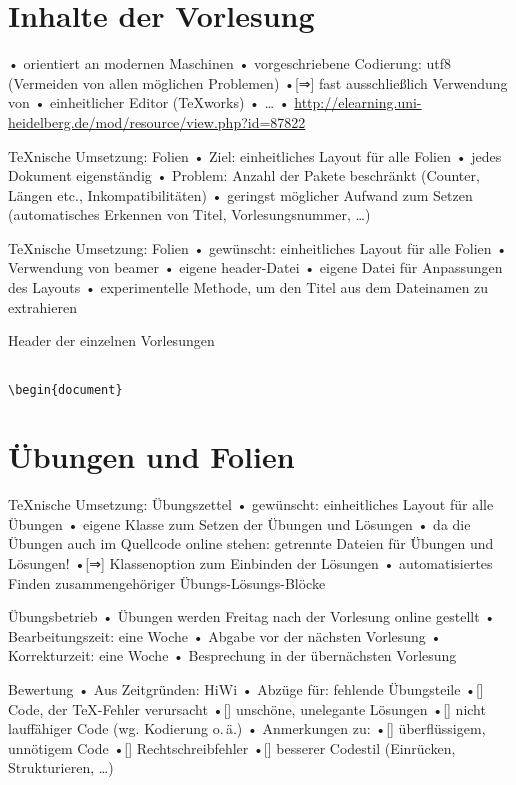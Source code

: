 \documentclass[t]{beamer}
\begin{document}
\section{Inhalte der Vorlesung}
\begin{frame}[fragile]
• orientiert an modernen Maschinen
• vorgeschriebene Codierung: utf8 (Vermeiden von allen möglichen Problemen)
•[⇒] fast ausschließlich Verwendung von \XeTeX
• einheitlicher Editor (\TeX works)
• …
• \url{http://elearning.uni-heidelberg.de/mod/resource/view.php?id=87822}
\•
\end{frame}

\begin{frame}{\TeX nische Umsetzung: Folien}
• Ziel: einheitliches Layout für alle Folien
• jedes Dokument eigenständig
• Problem: Anzahl der Pakete beschränkt (Counter, Längen etc., Inkompatibilitäten)
• geringst möglicher Aufwand zum Setzen (automatisches Erkennen von Titel, Vorlesungsnummer, …)
\•
\end{frame}

\begin{frame}{\TeX nische Umsetzung: Folien}
• gewünscht: einheitliches Layout für alle Folien
• Verwendung von beamer
• eigene header-Datei
• eigene Datei für Anpassungen des Layouts
• experimentelle Methode, um den Titel aus dem Dateinamen zu extrahieren
\•
\end{frame}

\begin{frame}[fragile]{Header der einzelnen Vorlesungen}
\begin{verbatim}

\begin{document}
\end{verbatim}
\end{frame}

\section{Übungen und Folien}
\begin{frame}{\TeX nische Umsetzung: Übungszettel}
• gewünscht: einheitliches Layout für alle Übungen
• eigene Klasse zum Setzen der Übungen und Lösungen
• da die Übungen auch im Quellcode online stehen: getrennte Dateien für Übungen und Lösungen!
•[⇒] Klassenoption zum Einbinden der Lösungen
• automatisiertes Finden zusammengehöriger Übungs-Lösungs-Blöcke
\•
\end{frame}

\begin{frame}{Übungsbetrieb}
• Übungen werden Freitag nach der Vorlesung online gestellt
• Bearbeitungszeit: eine Woche
• Abgabe vor der nächsten Vorlesung
• Korrekturzeit: eine Woche
• Besprechung in der übernächsten Vorlesung
\• 
\end{frame}

\begin{frame}{Bewertung}
• Aus Zeitgründen: HiWi
• Abzüge für: fehlende Übungsteile
•[] Code, der \TeX-Fehler verursacht
•[] unschöne, unelegante Lösungen
•[] nicht lauffähiger Code (wg. Kodierung o.\,ä.)
• Anmerkungen zu:
•[] überflüssigem, unnötigem Code
•[] Rechtschreibfehler
•[] besserer Codestil (Einrücken, Strukturieren, …) 
\•
\end{frame}
\end{document}

